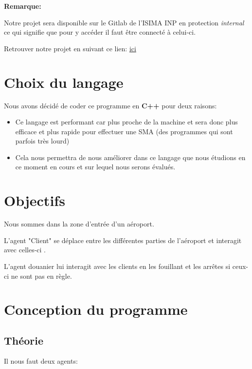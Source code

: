 \documentclass[12pt,french]{article} %
\begin{document}
 \bigskip
 
 \textbf{Remarque:}
 

Notre projet sera disponible sur le Gitlab de l'ISIMA INP en protection \textit{internal} ce qui signifie que pour y accéder il faut être connecté à celui-ci.

Retrouver notre projet en suivant ce lien: \href{https://gitlab.isima.fr/liballejos/smairport}{ici}

\newpage

\section{Choix du langage}

Nous avons décidé de coder ce programme en \textbf{C++} pour deux raisons:

\medskip

\begin{itemize}
	\item Ce langage est performant car plus proche de la machine et sera donc plus efficace et plus rapide pour effectuer une SMA (des programmes qui sont parfois très lourd)
	
	\item Cela nous permettra de nous améliorer dans ce langage que nous étudions en ce moment en cours et sur lequel nous serons évalués.
\end{itemize}



\section{Objectifs}

Nous sommes dans la zone d'entrée d'un aéroport.

L'agent "Client" se déplace entre les différentes parties de l'aéroport et interagit avec celles-ci .

L'agent douanier lui interagit avec les clients en les fouillant et les arrêtes si ceux-ci ne sont pas en règle.

\section{Conception du programme}

\subsection{Théorie}

Il nous faut deux agents:
\end{document}

